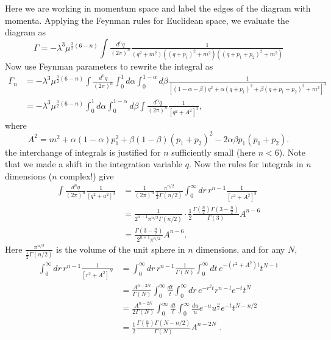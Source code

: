 \documentclass[12pt,leqno]{article}
\theoremstyle{plain}
{\theorembodyfont{}\newtheorem{thm}{Theorem}}
\theoremstyle{remark}
{\theorembodyfont{\rmfamily} \newtheorem*{Rem}{\bf Remark}}
\newcommand{\lam}{{\lambda}}
\begin{document}
Here we are working in momentum space and label the edges
of the diagram with momenta.
Applying the Feynman rules for  Euclidean space, we
evaluate the diagram as
$$
\Gamma=-\lam^3\mu^{\frac32(6-n)}\int\tfrac{d^nq}{(2\pi)^n}
\tfrac{1}{(q^2+m^2)((q+p_1)^2+m^2)((q+p_1+p_2)^2+m^2)}
$$
Now use Feynman parameters to rewrite the integral as
\begin{align}
\Gamma_n
&=-\lam^3\mu^{\frac32(6-n)}\int\tfrac{d^nq}{(2\pi)^n}\int_0^1
d\alpha\int_0^{1-\alpha}d\beta
\tfrac{1}{[(1-\alpha-\beta)q^2+\alpha(q+p_1)^2+\beta
  (q+p_1+p_2)^2+m^2]^3}\label{one}\\
&=-\lam^3\mu^{\frac32(6-n)}\int_0^1d\alpha\int_0^{1-\alpha}d\beta
\int\tfrac{d^nq}{(2\pi)^n}\tfrac{1}{[q^2+A^2]^3},\nonumber
\end{align}
where
\begin{equation}
A^2=m^2+\alpha(1-\alpha)p_1^2+\beta(1-\beta)(p_1+p_2)^2-
2\alpha\beta p_1(p_1+p_2).  \label{two}
\end{equation}
the interchange of integrals is justified for $n$
sufficiently small (here $n<6$).
Note that we made a shift in the integration variable
$q$.
Now the rules for integrals in $n$ dimensions ($n$
complex!) give
\begin{equation}
\begin{aligned}
\int\tfrac{d^nq}{(2\pi)^n}\tfrac{1}{[q^2+a^2]^3}
&=\tfrac{1}{(2\pi)^n}
\tfrac{\pi^{n/2}}{\frac12\Gamma(n/2)}\int_0^\infty
dr\,r^{n-1}\tfrac{1}{[r^2+A^2]^3}\\
&=\tfrac{1}{2^{n-1}\pi^{n/2}\Gamma(n/2)}\cdot
  \tfrac12\tfrac{\Gamma\left(\frac n2\right) \Gamma\left(
3-\frac n2\right)}{\Gamma(3)}A^{n-6}\\
&=\tfrac{\Gamma\left(3-\frac n2\right)}{2^{n+1}\pi^{n/2}}
  A^{n-6}.
\label{three}
\end{aligned}
\end{equation}
Here $\frac{\pi^{n/2}}{\frac12\Gamma(n/2)}$ is the volume
of the unit sphere in $n$ dimensions, and for any $N$, 
\begin{equation*}
\begin{align*}
\int_0^\infty dr\,r^{n-1}\tfrac{1}{[r^2+A^2]^N}
&=\int_0^\infty
dr\,r^{n-1}\tfrac{1}{\Gamma(N)}\int_0^\infty
dt\,e^{-(r^2+A^2)t}t^{N-1}\\
&=\tfrac{A^{n-2N}}{\Gamma(N)}
  \int_0^\infty \tfrac{dt}{t}\int_0^\infty
 dr\,e^{-r^2t}r^{n-l}e^{-t}t^N\\
&=\tfrac{A^{n-2N}}{2\Gamma(N)}\int_0^\infty
   \tfrac{dt}{t} \int_0^\infty \tfrac{du}{u}
  e^{-u}u^{\frac n2}e^{-t}t^{N-n/2}\\
&=\tfrac12 \tfrac{\Gamma\left(\frac n2\right) \Gamma
  (N-n/2)}{\Gamma(N)}A^{n-2N}\,\,.
\end{align*}
\end{equation*}
\end{document}

